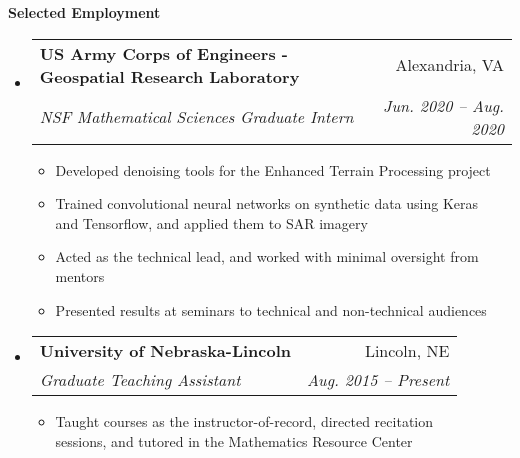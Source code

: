 \documentclass[letterpaper,11pt]{article}
\makeatletter
\newcommand{\resitem}[1]{\item #1 \vspace{-2pt}}
\newcommand{\resheading}[1]{{\large \colorbox{mygrey}{\begin{minipage}{\textwidth}{\textbf{#1 \vphantom{p\^{E}}}}\end{minipage}}}}
\newcommand{\ressubheading}[4]{
\begin{tabular*}{6.5in}{l@{\extracolsep{\fill}}r}
		\textbf{#1} & #2 \\
		\textit{#3} & \textit{#4} \\
\end{tabular*}\vspace{-6pt}}
\makeatother
\begin{document}
\resheading{Selected Employment}
	\begin{itemize}
				\item
		\ressubheading{US Army Corps of Engineers - Geospatial Research Laboratory}{Alexandria, VA}{NSF Mathematical Sciences Graduate Intern}{Jun. 2020 -- Aug. 2020}
		{\footnotesize
			\begin{itemize}
				\resitem{Developed denoising tools for the Enhanced Terrain Processing project}
				\resitem{Trained convolutional neural networks on synthetic data using Keras \\ and Tensorflow, and applied them to SAR imagery}
				\resitem{Acted as the technical lead, and worked with minimal oversight from mentors}
				\resitem{Presented results at seminars to technical and non-technical audiences}
		\end{itemize}}

\newpage

		\item
			{\ressubheading{University of Nebraska-Lincoln}{Lincoln, NE}{Graduate Teaching Assistant}{Aug. 2015 -- Present}
				{ \footnotesize
				\begin{itemize}
					\resitem{Taught courses as the instructor-of-record, directed recitation \\ sessions, and tutored in the Mathematics Resource Center}
				\end{itemize}}}


\end{itemize}
\end{document}
